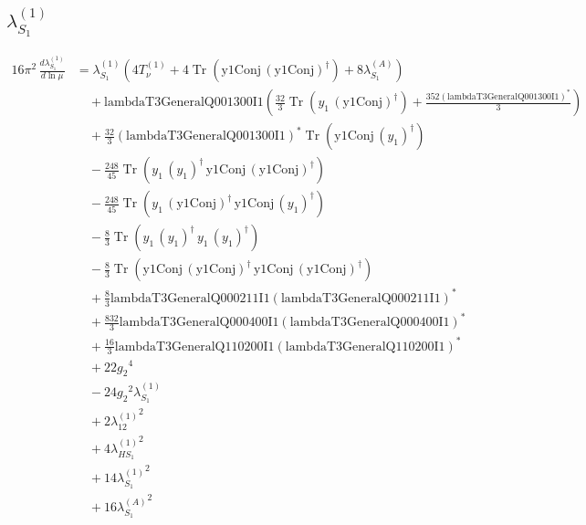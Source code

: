 \documentclass[10pt,a4paper]{article}
\begin{document}
\subsection*{$\lambda_{S_1}^{(1)}$}
\begin{align*}
16\pi^2\,\frac{d \lambda_{S_1}^{(1)}}{d\ln\mu} &={\lambda_{S_1}^{(1)}} (4 T_{\nu}^{(1)}+4 \operatorname{Tr}\!\left(\text{y1Conj}\,\left(\text{y1Conj}\right)^{\dagger}\right)+8 {\lambda_{S_1}^{(A)}}) \\
&\quad +\text{lambdaT3GeneralQ001300I1} \left(\frac{32}{3} \operatorname{Tr}\!\left({y_1}\,\left(\text{y1Conj}\right)^{\dagger}\right)+\frac{352 \left(\text{lambdaT3GeneralQ001300I1}\right)^{*}}{3}\right) \\
&\quad +\frac{32}{3} \left(\text{lambdaT3GeneralQ001300I1}\right)^{*} \operatorname{Tr}\!\left(\text{y1Conj}\,\left({y_1}\right)^{\dagger}\right) \\
&\quad -\frac{248}{45} \operatorname{Tr}\!\left({y_1}\,\left({y_1}\right)^{\dagger}\,\text{y1Conj}\,\left(\text{y1Conj}\right)^{\dagger}\right) \\
&\quad -\frac{248}{45} \operatorname{Tr}\!\left({y_1}\,\left(\text{y1Conj}\right)^{\dagger}\,\text{y1Conj}\,\left({y_1}\right)^{\dagger}\right) \\
&\quad -\frac{8}{3} \operatorname{Tr}\!\left({y_1}\,\left({y_1}\right)^{\dagger}\,{y_1}\,\left({y_1}\right)^{\dagger}\right) \\
&\quad -\frac{8}{3} \operatorname{Tr}\!\left(\text{y1Conj}\,\left(\text{y1Conj}\right)^{\dagger}\,\text{y1Conj}\,\left(\text{y1Conj}\right)^{\dagger}\right) \\
&\quad +\frac{8}{3} \text{lambdaT3GeneralQ000211I1} \left(\text{lambdaT3GeneralQ000211I1}\right)^{*} \\
&\quad +\frac{832}{3} \text{lambdaT3GeneralQ000400I1} \left(\text{lambdaT3GeneralQ000400I1}\right)^{*} \\
&\quad +\frac{16}{3} \text{lambdaT3GeneralQ110200I1} \left(\text{lambdaT3GeneralQ110200I1}\right)^{*} \\
&\quad +22 {g_2}^4 \\
&\quad -24 {g_2}^2 {\lambda_{S_1}^{(1)}} \\
&\quad +2 {\lambda_{12}^{(1)}}^2 \\
&\quad +4 {\lambda_{HS_1}^{(1)}}^2 \\
&\quad +14 {\lambda_{S_1}^{(1)}}^2 \\
&\quad +16 {\lambda_{S_1}^{(A)}}^2 \\
\end{align*}
\end{document}
